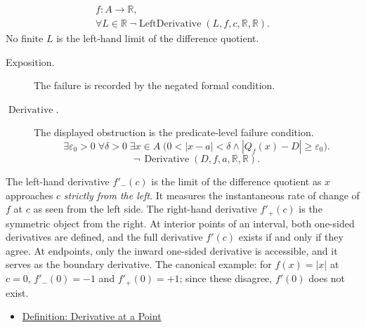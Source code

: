 \begin{remark*}
\[
\begin{aligned}
  f\colon A\to\mathbb{R},\\
\forall L \in \mathbb{R}\;\lnot\operatorname{LeftDerivative}(L,f,c,\mathbb{R},\mathbb{R}).
\end{aligned}
\]
No finite $L$ is the left-hand limit of the difference quotient.
\end{remark*}

\begin{remark*}
\begin{description}
  \item[Exposition.]
  The failure is recorded by the negated formal condition.

  \item[\(\operatorname{Derivative}.\)]
  The displayed obstruction is the predicate-level failure condition.
  \[
  \exists\varepsilon_0>0\;\forall\delta>0\;\exists x\in A\;\bigl(0<|x-a|<\delta\land |Q_f(x)-D|\ge\varepsilon_0\bigr).
  \]
  \[
  \neg\,\operatorname{Derivative}(D,f,a,\mathbb{R},\mathbb{R}).
  \]
\end{description}
\end{remark*}


\begin{remark*}[Interpretation]
The left-hand derivative $f'_-(c)$ is the limit of the difference quotient as $x$ approaches $c$ \emph{strictly from the left}. It measures the instantaneous rate of change of $f$ at $c$ as seen from the left side. The right-hand derivative $f'_+(c)$ is the symmetric object from the right. At interior points of an interval, both one-sided derivatives are defined, and the full derivative $f'(c)$ exists if and only if they agree. At endpoints, only the inward one-sided derivative is accessible, and it serves as the boundary derivative. The canonical example: for $f(x) = |x|$ at $c = 0$, $f'_-(0) = -1$ and $f'_+(0) = +1$; since these disagree, $f'(0)$ does not exist.
\end{remark*}

\begin{dependencies}
\begin{itemize}
  \item \hyperref[def:derivative-at-a-point]{Definition: Derivative at a Point}
\end{itemize}
\end{dependencies}


